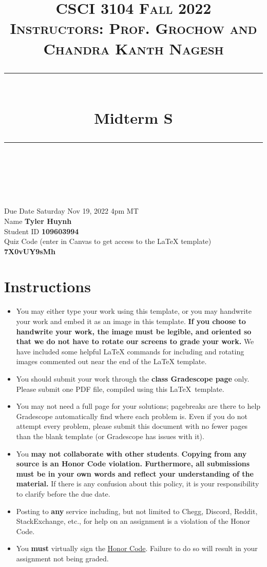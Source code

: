 \documentclass[11pt]{article}
\title{
\normalfont \normalsize 
\textsc{CSCI 3104 Fall 2022 \\ 
Instructors: Prof. Grochow and Chandra Kanth Nagesh} \\
[10pt] 
\rule{\linewidth}{0.5pt} \\[6pt] 
\huge Midterm S\standard \\
\rule{\linewidth}{2pt}  \\[10pt]
}
\date{}
\theoremstyle{definition}
\theoremstyle{definition}
\theoremstyle{definition}
\begin{document}

\maketitle


\noindent
Due Date \dotfill Saturday Nov 19, 2022 4pm MT \\
Name \dotfill \textbf{Tyler Huynh} \\
Student ID \dotfill \textbf{109603994} \\
Quiz Code (enter in Canvas to get access to the LaTeX template) \dotfill \textbf{7X0vUY9sMh}


\tableofcontents

\section*{Instructions}
 \begin{itemize}
	\item You may either type your work using this template, or you may handwrite your work and embed it as an image in this template. \textbf{If you choose to handwrite your work, the image must be legible, and oriented so that we do not have to rotate our screens to grade your work.} We have included some helpful LaTeX commands for including and rotating images commented out near the end of the LaTeX template.
	\item You should submit your work through the \textbf{class Gradescope page} only. Please submit one PDF file, compiled using this \LaTeX \ template.
	\item You may not need a full page for your solutions; pagebreaks are there to help Gradescope automatically find where each problem is. Even if you do not attempt every problem, please submit this document with no fewer pages than the blank template (or Gradescope has issues with it).

	\item You \textbf{may not collaborate with other students}. \textbf{Copying from any source is an Honor Code violation. Furthermore, all submissions must be in your own words and reflect your understanding of the material.} If there is any confusion about this policy, it is your responsibility to clarify before the due date. 

	\item Posting to \textbf{any} service including, but not limited to Chegg, Discord, Reddit, StackExchange, etc., for help on an assignment is a violation of the Honor Code.

	\item You \textbf{must} virtually sign the \hyperlink{HonorCode}{Honor Code}. Failure to do so will result in your assignment not being graded.
\end{itemize}
\end{document}
